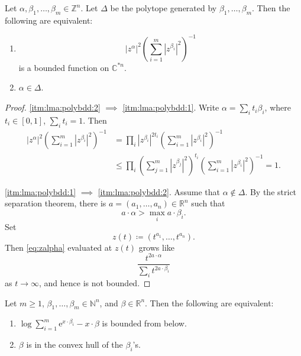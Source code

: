 \begin{lemma}\label{lma:polybdd}
	Let $\alpha,\beta_1,\ldots,\beta_m\in \mathbb{Z}^n$. Let $\Delta$ be the polytope generated by $\beta_1,\ldots,\beta_m$. Then the following are equivalent:
	\begin{enumerate}
		\item\label{itm:lma:polybdd:1}
		      \begin{equation}\label{eq:zalpha}
			      |z^{\alpha}|^2\left(\sum_{i=1}^m |z^{\beta_i}|^2 \right)^{-1}
		      \end{equation}
		      is a bounded function on $\mathbb{C}^{*n}$.
		\item\label{itm:lma:polybdd:2} $\alpha\in \Delta$.
	\end{enumerate}
\end{lemma}
\begin{proof}
	\ref{itm:lma:polybdd:2} $\implies$ \ref{itm:lma:polybdd:1}. Write $\alpha=\sum_i t_i\beta_i$, where $t_i\in [0,1]$, $\sum_i t_i=1$. Then
	\[
 \begin{aligned}
			|z^{\alpha}|^2\left(\sum_{i=1}^m |z^{\beta_i}|^2 \right)^{-1}
            &=\prod_i |z^{\beta_i}|^{2t_i}\left(\sum_{i=1}^m |z^{\beta_i}|^2 \right)^{-1}\\
            &\leq \prod_i\left(\sum_{j=1}^m |z^{\beta_j}|^2\right)^{t_i}
            \left(\sum_{i=1}^m |z^{\beta_i}|^2 \right)^{-1}=1.
	  \end{aligned}
		\]

		\ref{itm:lma:polybdd:1} $\implies$ \ref{itm:lma:polybdd:2}. Assume that $\alpha\not\in \Delta$. By the strict separation theorem, there is $a=(a_1,\ldots,a_n)\in\mathbb{R}^n$ such that
        \[
        a\cdot\alpha>\max_i a\cdot\beta_i.
        \]
        Set
		\[
			z(t)\coloneqq (t^{a_1},\ldots,t^{a_n}).
		\]
		Then \eqref{eq:zalpha} evaluated at $z(t)$ grows like
        \[
        \frac{t^{2a\cdot \alpha}}{\sum_i t^{2a\cdot\beta_i}}
        \]
        as $t\to\infty$, and hence is not bounded.
\end{proof}
\begin{lemma}\label{lma:polybdd2}
	Let $m\geq 1$, $\beta_1,\ldots,\beta_m\in \mathbb{N}^n$, and $\beta\in \mathbb{R}^n$. Then the following are equivalent:
	\begin{enumerate}
		\item\label{itm:lma:polybdd2:1} $\log \sum_{i=1}^m \mathrm{e}^{x\cdot\beta_i}-x\cdot\beta$ is bounded from below.
		\item\label{itm:lma:polybdd2:2} $\beta$ is in the convex hull of the $\beta_i$'s.
	\end{enumerate}
\end{lemma}
